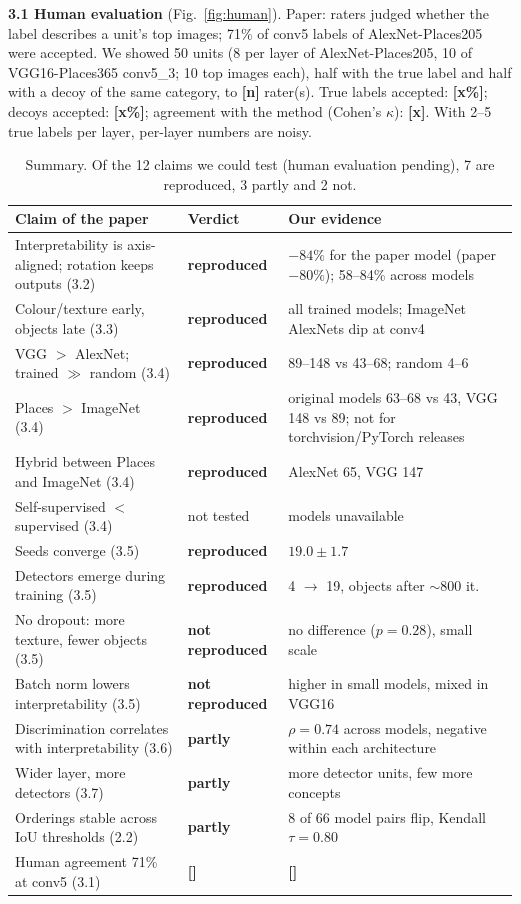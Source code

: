 \documentclass[10pt,a4paper]{article}
\newcommand{\fillin}[1]{\colorbox{yellow!40}{\textbf{[#1]}}}
\newcommand{\ok}{\textcolor{green!45!black}{\textbf{reproduced}}}
\newcommand{\partly}{\textcolor{orange!80!black}{\textbf{partly}}}
\newcommand{\no}{\textcolor{red!70!black}{\textbf{not reproduced}}}
\begin{document}
\textbf{3.1 Human evaluation} (Fig.~\ref{fig:human}). Paper: raters judged whether the label describes a unit's top images;
71\% of conv5 labels of AlexNet-Places205 were accepted. We showed 50 units (8 per layer of AlexNet-Places205, 10 of
VGG16-Places365 conv5\_3; 10 top images each), half with the true label and half with a decoy of the same category, to
\fillin{n} rater(s). True labels accepted: \fillin{x\%}; decoys accepted: \fillin{x\%}; agreement with the method
(Cohen's $\kappa$): \fillin{x}. With 2--5 true labels per layer, per-layer numbers are noisy.

\begin{table}[t]\centering\small
\begin{tabularx}{\linewidth}{@{}Xlp{5.3cm}@{}}\toprule
Claim of the paper & Verdict & Our evidence \\\midrule
Interpretability is axis-aligned; rotation keeps outputs (3.2) & \ok & $-84\%$ for the paper model (paper $-80\%$); 58--84\% across models \\
Colour/texture early, objects late (3.3) & \ok & all trained models; ImageNet AlexNets dip at conv4 \\
VGG $>$ AlexNet; trained $\gg$ random (3.4) & \ok & 89--148 vs 43--68; random 4--6 \\
Places $>$ ImageNet (3.4) & \ok & original models 63--68 vs 43, VGG 148 vs 89; not for torchvision/PyTorch releases \\
Hybrid between Places and ImageNet (3.4) & \ok & AlexNet 65, VGG 147 \\
Self-supervised $<$ supervised (3.4) & not tested & models unavailable \\
Seeds converge (3.5) & \ok & $19.0\pm1.7$ \\
Detectors emerge during training (3.5) & \ok & 4 $\to$ 19, objects after $\sim$800 it. \\
No dropout: more texture, fewer objects (3.5) & \no & no difference ($p=0.28$), small scale \\
Batch norm lowers interpretability (3.5) & \no & higher in small models, mixed in VGG16 \\
Discrimination correlates with interpretability (3.6) & \partly & $\rho=0.74$ across models, negative within each architecture \\
Wider layer, more detectors (3.7) & \partly & more detector units, few more concepts \\
Orderings stable across IoU thresholds (2.2) & \partly & 8 of 66 model pairs flip, Kendall $\tau=0.80$ \\
Human agreement 71\% at conv5 (3.1) & \fillin{} & \fillin{} \\\bottomrule
\end{tabularx}
\caption{Summary. Of the 12 claims we could test (human evaluation pending), 7 are reproduced, 3 partly and 2 not.}\label{tab:sum}
\end{table}
\end{document}
